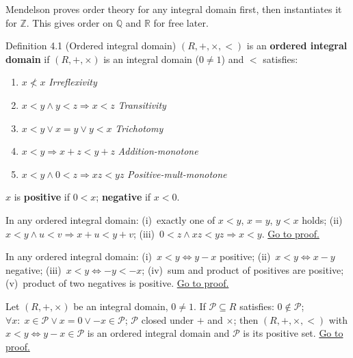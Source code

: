 \begin{remark*}[Strategy]
Mendelson proves order theory for any integral domain first, then
instantiates it for $\mathbb{Z}$.
This gives order on $\mathbb{Q}$ and $\mathbb{R}$ for free later.
\end{remark*}

\begin{corollarybox}{Definition 4.1 (Ordered integral domain)}
$(R,+,\times,<)$ is an \textbf{ordered integral domain} if
$(R,+,\times)$ is an integral domain ($0\neq 1$) and $<$ satisfies:
\begin{enumerate}
  \item[(O1)] $x \not< x$ \hfill\textit{Irreflexivity}
  \item[(O2)] $x<y \wedge y<z \Rightarrow x<z$ \hfill\textit{Transitivity}
  \item[(O3)] $x<y \vee x=y \vee y<x$ \hfill\textit{Trichotomy}
  \item[(O4)] $x<y \Rightarrow x+z<y+z$ \hfill\textit{Addition-monotone}
  \item[(O5)] $x<y \wedge 0<z \Rightarrow xz<yz$ \hfill\textit{Positive-mult-monotone}
\end{enumerate}
$x$ is \textbf{positive} if $0<x$; \textbf{negative} if $x<0$.
\end{corollarybox}

\begin{theorem}
\label{thm:men-order-axiom-consequences}
In any ordered integral domain:
(i)~exactly one of $x<y$, $x=y$, $y<x$ holds;
(ii)~$x<y \wedge u<v \Rightarrow x+u<y+v$;
(iii)~$0<z \wedge xz<yz \Rightarrow x<y$.
\hyperref[prf:men-order-axiom-consequences]{Go to proof.}
\end{theorem}

\begin{theorem}
\label{thm:men-order-and-positivity}
In any ordered integral domain:
(i)~$x<y \iff y-x$ positive;
(ii)~$x<y \iff x-y$ negative;
(iii)~$x<y \iff -y<-x$;
(iv)~sum and product of positives are positive;
(v)~product of two negatives is positive.
\hyperref[prf:men-order-and-positivity]{Go to proof.}
\end{theorem}

\begin{theorem}
\label{thm:men-pos-set}
Let $(R,+,\times)$ be an integral domain, $0\neq 1$.
If $\mathcal{P}\subseteq R$ satisfies:
$0\notin\mathcal{P}$;
$\forall x:\; x\in\mathcal{P} \vee x=0 \vee {-x}\in\mathcal{P}$;
$\mathcal{P}$ closed under $+$ and $\times$;
then $(R,+,\times,<)$ with $x<y \iff y-x\in\mathcal{P}$ is an
ordered integral domain and $\mathcal{P}$ is its positive set.
\hyperref[prf:men-pos-set]{Go to proof.}
\end{theorem}

